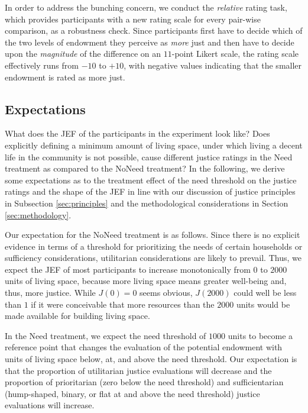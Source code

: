 \documentclass[12pt]{scrartcl}
\begin{document}
In order to address the bunching concern, we conduct the \textit{relative} rating task, which provides participants with a new rating scale for every pair-wise comparison, as a robustness check.
Since participants first have to decide which of the two levels of endowment they perceive as \textit{more} just and then have to decide upon the \textit{magnitude} of the difference on an $11$-point Likert scale, the rating scale effectively runs from $-10$ to $+10$, with negative values indicating that the smaller endowment is rated as more just.


\subsection{Expectations}\label{sec:expectations}
What does the JEF of the participants in the experiment look like?
Does explicitly defining a minimum amount of living space, under which living a decent life in the community is not possible, cause different justice ratings in the Need treatment as compared to the NoNeed treatment?
In the following, we derive some expectations as to the treatment effect of the need threshold on the justice ratings and the shape of the JEF in line with our discussion of justice principles in Subsection \ref{sec:principles} and the methodological considerations in Section \ref{sec:methodology}.

Our expectation for the NoNeed treatment is as follows.
Since there is no explicit evidence in terms of a threshold for prioritizing the needs of certain households or sufficiency considerations, utilitarian considerations are likely to prevail.
Thus, we expect the JEF of most participants to increase monotonically from $0$ to $2000$ units of living space, because more living space means greater well-being and, thus, more justice.
While $J(0)=0$ seems obvious, $J(2000)$ could well be less than $1$ if it were conceivable that more resources than the $2000$ units would be made available for building living space.

In the Need treatment, we expect the need threshold of $1000$ units to become a reference point that changes the evaluation of the potential endowment with units of living space below, at, and above the need threshold.
Our expectation is that the proportion of utilitarian justice evaluations will decrease and the proportion of prioritarian (zero below the need threshold) and sufficientarian (hump-shaped, binary, or flat at and above the need threshold) justice evaluations will increase.
\end{document}

